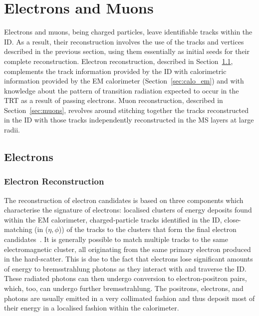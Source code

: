 \section{Electrons and Muons}
\label{sec:leptons}

Electrons and muons, being charged particles, leave identifiable tracks
within the ID.
As a result, their reconstruction involves the use of the tracks and
vertices described in the previous section, using them essentially as initial
seeds for their complete reconstruction.
Electron reconstruction, described in Section~\ref{sec:electrons}, complements the track information provided by the ID
with calorimetric information provided by the EM calorimeter (Section~\ref{sec:calo_em})
and with knowledge about the pattern of transition radiation expected to occur
in the TRT as a result of passing electrons.
Muon reconstruction, described in Section~\ref{sec:muons}, revolves around stitching together the tracks reconstructed
in the ID with those tracks independently reconstructed in the MS layers at large radii.

\subsection{Electrons}
\label{sec:electrons}

\subsubsection{Electron Reconstruction}
\label{sec:electron_reco}

The reconstruction of electron candidates is based on three components which
characterise the signature of electrons: localised clusters of energy
deposits found within the EM calorimeter, charged-particle tracks
identified in the ID, close-matching (in ($\eta,\phi$)) of the tracks to the clusters
that form the final electron candidates~\cite{Aaboud:2657964}.
It is generally possible to match multiple tracks to the same electromagnetic cluster,
all originating from the same primary electron produced in the hard-scatter.
This is due to the fact that electrons lose significant amounts of energy to bremsstrahlung
photons as they interact with and traverse the ID.
These radiated photons can then undergo conversion to electron-positron pairs,
which, too, can undergo further bremsstrahlung.
The positrons, electrons, and photons are usually emitted in a very collimated fashion
and thus deposit most of their energy in a localised fashion within the calorimeter.

